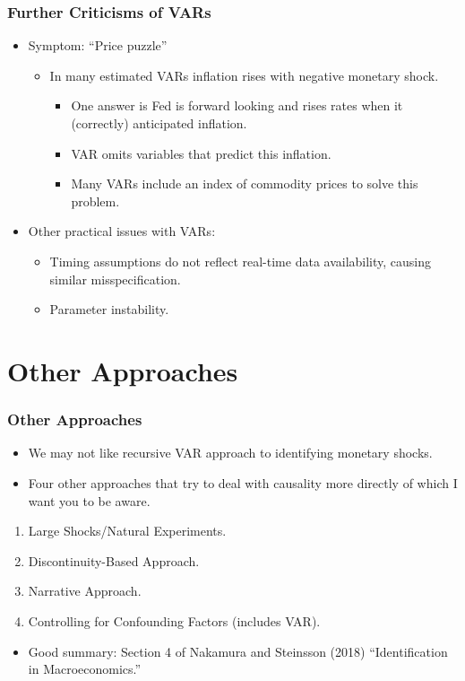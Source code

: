 \documentclass[english,xcolor=svgnames]{beamer}
\begin{document}
\begin{frame}
\frametitle{Further Criticisms of VARs
}
\begin{itemize}
	\item Symptom: ``Price puzzle''
	\begin{itemize}
		\item In many estimated VARs inflation rises with negative monetary shock.
		\begin{itemize}
			\item One answer is Fed is forward looking and rises rates when it (correctly) anticipated inflation.
			\item VAR omits variables that predict this inflation.
			\item Many VARs include an index of commodity prices to solve this problem.
		\end{itemize}
	\end{itemize}
	\item Other practical issues with VARs:
	\begin{itemize}
		\item Timing assumptions do not reflect real-time data availability, causing similar misspecification.
		\item Parameter instability.
	\end{itemize}
\end{itemize}
\end{frame}


\section{Other Approaches}

\begin{frame}
\frametitle{Other Approaches}
\begin{itemize}
	\item We may not like recursive VAR approach to identifying monetary shocks.
	\item Four other approaches that try to deal with causality more directly of which I want you to be aware.
\end{itemize}
\begin{enumerate}[1.]
	\item Large Shocks/Natural Experiments.
	\item Discontinuity-Based Approach.
	\item Narrative Approach.
	\item Controlling for Confounding Factors (includes VAR).
\end{enumerate}
\begin{itemize}
	\item Good summary: Section 4 of Nakamura and Steinsson (2018) ``Identification in Macroeconomics.''
\end{itemize}
\end{frame}
\end{document}
